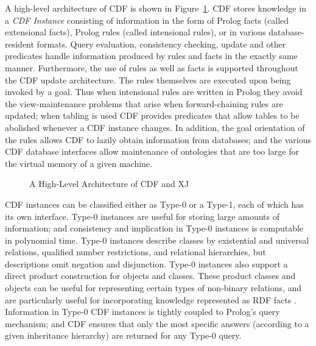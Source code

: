 A high-level architecture of CDF is shown in Figure~\ref{fig:arch}.
CDF stores knowledge in a {\em CDF Instance} consisting of information
in the form of Prolog facts (called extensional facts), Prolog rules
(called intensional rules), or in various database-resident formats.
Query evaluation, consistency checking, update and other predicates
handle information produced by rules and facts in the exactly same
manner.  Furthermore, the use of rules as well as facts is supported
throughout the CDF update architecture.  The rules themselves are
executed upon being invoked by a goal.  Thus when intensional rules
are written in Prolog they avoid the view-maintenance problems that
arise when forward-chaining rules are updated; when tabling is used
CDF provides predicates that allow tables to be abolished whenever a
CDF instance changes.  In addition, the goal orientation of the rules
allows CDF to lazily obtain information from databases; and the
various CDF database interfaces allow maintenance of ontologies that
are too large for the virtual memory of a given machine.

\begin{figure}[htbp] 
\caption{A High-Level Architecture of CDF and XJ}
\label{fig:arch}
\end{figure}

CDF instances can be classified either as Type-0 or a Type-1, each of
which has its own interface.  Type-0 instances are useful for storing
large amounts of information; and consistency and implication in
Type-0 instances is computable in polynomial time.  Type-0 instances
describe classes by existential and universal relations, qualified
number restrictions, and relational hierarchies, but descriptions omit
negation and disjunction. Type-0 instances also support a direct
product construction for objects and classes.  These product classes
and objects can be useful for representing certain types of non-binary
relations, and are particularly useful for incorporating knowledge
represented as RDF facts \cite{}.  Information in Type-0 CDF instances
is tightly coupled to Prolog's query mechanism; and CDF ensures that
only the most specific answers (according to a given inheritance
hierarchy) are returned for any Type-0 query.

